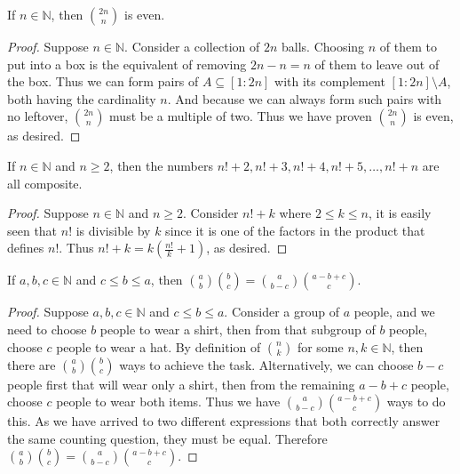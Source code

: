 \documentclass{exam}
\begin{document}
\begin{proposition}{4.23}
    If $n \in \mathbb N$, then $\binom{2n}n$ is even.
\end{proposition}

\begin{proof}
    Suppose $n\in\mathbb N$. Consider a collection of $2n$ balls. Choosing $n$ of them to put into a box is the equivalent of removing $2n - n = n$ of them to leave out of the box. Thus we can form pairs of $A\subseteq [1:2n]$ with its complement $[1:2n] \setminus A$, both having the cardinality $n$. And because we can always form such pairs with no leftover, $\binom{2n}n$ must be a multiple of two. Thus we have proven $\binom{2n}n$ is even, as desired.
\end{proof}

\begin{proposition}{4.24}
    If $n\in\mathbb N$ and $n\ge 2$, then the numbers $n!+2,n!+3, n!+4, n!+5,\dots,n!+n$ are all composite.
\end{proposition}

\begin{proof}
    Suppose $n\in\mathbb N$ and $n\ge2$. Consider $n!+k$ where $2 \le k \le n$, it is easily seen that $n!$ is divisible by $k$ since it is one of the factors in the product that defines $n!$. Thus $n! + k = k\left(\frac{n!}k + 1\right)$, as desired.
\end{proof}

\begin{proposition}{4.25}
    If $a,b,c\in\mathbb N$ and $c\le b\le a$, then $\binom a b\binom b c = \binom{a}{b-c}\binom{a-b+c}c$.
\end{proposition}

\begin{proof}
    Suppose $a,b,c\in\mathbb N$ and $c\le b\le a$. Consider a group of $a$ people, and we need to choose $b$ people to wear a shirt, then from that subgroup of $b$ people, choose $c$ people to wear a hat. By definition of $\binom{n}{k}$ for some $n, k\in\mathbb N$, then there are $\binom a b\binom b c$ ways to achieve the task. Alternatively, we can choose $b-c$ people first that will wear only a shirt, then from the remaining $a-b+c$ people, choose $c$ people to wear both items. Thus we have $\binom{a}{b-c}\binom{a-b+c}c$ ways to do this. As we have arrived to two different expressions that both correctly answer the same counting question, they must be equal. Therefore $\binom a b\binom b c = \binom{a}{b-c}\binom{a-b+c}c$.
\end{proof}
\end{document}
